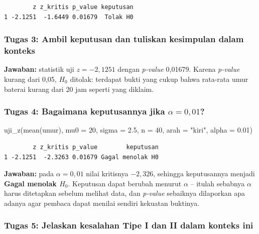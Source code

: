 \documentclass[
  indonesian,
  letterpaper,
]{book}
\newenvironment{Shaded}{\begin{snugshade}}{\end{snugshade}}
\newcommand{\AttributeTok}[1]{\textcolor[rgb]{0.40,0.45,0.13}{#1}}
\newcommand{\DecValTok}[1]{\textcolor[rgb]{0.68,0.00,0.00}{#1}}
\newcommand{\FloatTok}[1]{\textcolor[rgb]{0.68,0.00,0.00}{#1}}
\newcommand{\FunctionTok}[1]{\textcolor[rgb]{0.28,0.35,0.67}{#1}}
\newcommand{\NormalTok}[1]{\textcolor[rgb]{0.00,0.23,0.31}{#1}}
\newcommand{\StringTok}[1]{\textcolor[rgb]{0.13,0.47,0.30}{#1}}
\begin{document}
\begin{verbatim}
        z z_kritis p_value keputusan
1 -2.1251  -1.6449 0.01679  Tolak H0
\end{verbatim}

\subsubsection{Tugas 3: Ambil keputusan dan tuliskan kesimpulan dalam
konteks}\label{tugas-3-ambil-keputusan-dan-tuliskan-kesimpulan-dalam-konteks}

\textbf{Jawaban:} statistik uji \(z = -2{,}1251\) dengan \emph{p-value}
0,01679. Karena \emph{p-value} kurang dari 0,05, \(H_0\) ditolak:
terdapat bukti yang cukup bahwa rata-rata umur baterai kurang dari 20
jam seperti yang diklaim.

\subsubsection{\texorpdfstring{Tugas 4: Bagaimana keputusannya jika
\(\alpha = 0{,}01\)?}{Tugas 4: Bagaimana keputusannya jika \textbackslash alpha = 0\{,\}01?}}\label{tugas-4-bagaimana-keputusannya-jika-alpha-001}

\begin{Shaded}
\begin{Highlighting}[]
\FunctionTok{uji\_z}\NormalTok{(}\FunctionTok{mean}\NormalTok{(umur), }\AttributeTok{mu0 =} \DecValTok{20}\NormalTok{, }\AttributeTok{sigma =} \FloatTok{2.5}\NormalTok{, }\AttributeTok{n =} \DecValTok{40}\NormalTok{, }\AttributeTok{arah =} \StringTok{"kiri"}\NormalTok{, }\AttributeTok{alpha =} \FloatTok{0.01}\NormalTok{)}
\end{Highlighting}
\end{Shaded}

\begin{verbatim}
        z z_kritis p_value        keputusan
1 -2.1251  -2.3263 0.01679 Gagal menolak H0
\end{verbatim}

\textbf{Jawaban:} pada \(\alpha = 0{,}01\) nilai kritisnya \(-2{,}326\),
sehingga keputusannya menjadi \textbf{Gagal menolak \(H_0\)}. Keputusan
dapat berubah menurut \(\alpha\) -- itulah sebabnya \(\alpha\) harus
ditetapkan sebelum melihat data, dan \emph{p-value} sebaiknya dilaporkan
apa adanya agar pembaca dapat menilai sendiri kekuatan buktinya.

\subsubsection{Tugas 5: Jelaskan kesalahan Tipe I dan II dalam konteks
ini}\label{tugas-5-jelaskan-kesalahan-tipe-i-dan-ii-dalam-konteks-ini}
\end{document}
